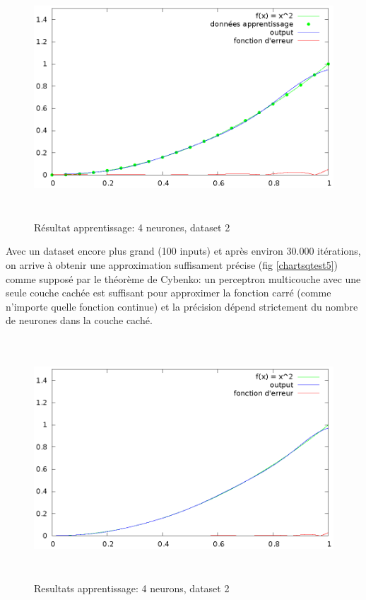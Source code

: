 \documentclass[twoside,openright,a4paper,11pt,french]{article}
\begin{document}
\begin{figure}[h]
\centering
\includegraphics[width=12cm,height=9cm]{./pics/chartsqtest4.eps}
\caption{Résultat apprentissage: 4 neurones, dataset 2}
\label{fig:chartsqtest4}
\end{figure}

Avec un dataset encore plus grand (100 inputs) et après environ
30.000 itérations, on arrive à obtenir une approximation suffisament
précise (fig \ref{chartsqtest5}) comme supposé par le théorème de Cybenko:
un perceptron multicouche avec une seule couche cachée est suffisant pour
approximer la fonction carré (comme n'importe quelle fonction continue) 
et la précision dépend strictement du nombre de neurones dans la couche caché.

\begin{figure}[h]
\centering
\includegraphics[width=12cm,height=9cm]{./pics/chartsqtest5.eps}
\caption{Resultats apprentissage: 4 neurons, dataset 2}
\label{fig:chartsqtest5}
\end{figure}


\clearpage
{}


\end{document}
